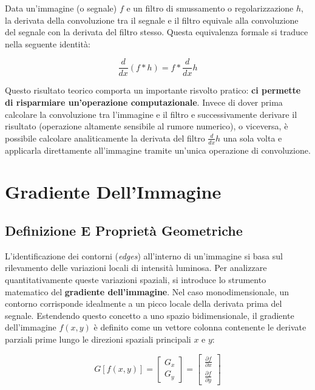 ﻿\documentclass[11pt, a4paper]{article}
\begin{document}
Data un'immagine (o segnale) $f$ e un filtro di smussamento o regolarizzazione $h$, la derivata della convoluzione tra il segnale e il filtro equivale alla convoluzione del segnale con la derivata del filtro stesso. Questa equivalenza formale si traduce nella seguente identità:

\[ \frac{d}{dx}(f * h) = f * \frac{d}{dx}h \]

Questo risultato teorico comporta un importante risvolto pratico: \textbf{ci permette di risparmiare un'operazione computazionale}. Invece di dover prima calcolare la convoluzione tra l'immagine e il filtro e successivamente derivare il risultato (operazione altamente sensibile al rumore numerico), o viceversa, è possibile calcolare analiticamente la derivata del filtro $\frac{d}{dx}h$ una sola volta e applicarla direttamente all'immagine tramite un'unica operazione di convoluzione.


\newpage

\section{Gradiente Dell'Immagine}

\subsection{Definizione E Proprietà Geometriche}

L'identificazione dei contorni (\emph{edges}) all'interno di un'immagine si basa sul rilevamento delle variazioni locali di intensità luminosa. Per analizzare quantitativamente queste variazioni spaziali, si introduce lo strumento matematico del \textbf{gradiente dell'immagine}. Nel caso monodimensionale, un contorno corrisponde idealmente a un picco locale della derivata prima del segnale. Estendendo questo concetto a uno spazio bidimensionale, il gradiente dell'immagine $f(x,y)$ è definito come un vettore colonna contenente le derivate parziali prime lungo le direzioni spaziali principali $x$ e $y$:

\[ G[f(x,y)] = \begin{bmatrix} G_x \\ G_y \end{bmatrix} = \begin{bmatrix} \frac{\partial f}{\partial x} \\[0.8em] \frac{\partial f}{\partial y} \end{bmatrix} \]
\end{document}
